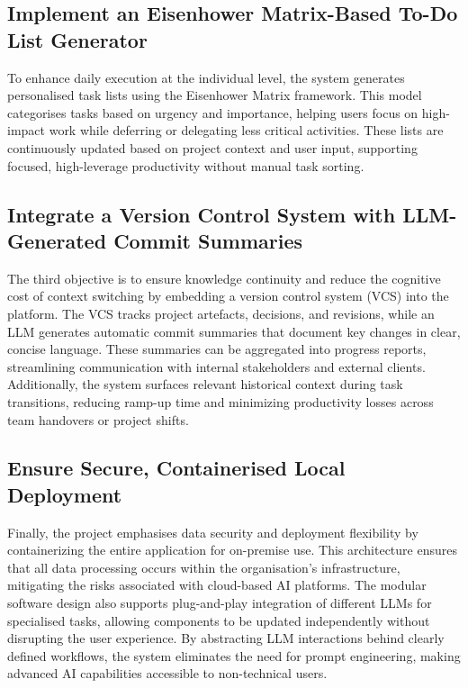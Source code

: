 \documentclass{report}
\begin{document}
\subsection{Implement an Eisenhower Matrix-Based To-Do List Generator}
To enhance daily execution at the individual level, the system generates personalised task lists using the Eisenhower Matrix framework. This model categorises tasks based on urgency and importance, helping users focus on high-impact work while deferring or delegating less critical activities. These lists are continuously updated based on project context and user input, supporting focused, high-leverage productivity without manual task sorting.
\subsection{Integrate a Version Control System with LLM-Generated Commit Summaries}
The third objective is to ensure knowledge continuity and reduce the cognitive cost of context switching by embedding a version control system (VCS) into the platform. The VCS tracks project artefacts, decisions, and revisions, while an LLM generates automatic commit summaries that document key changes in clear, concise language. These summaries can be aggregated into progress reports, streamlining communication with internal stakeholders and external clients. Additionally, the system surfaces relevant historical context during task transitions, reducing ramp-up time and minimizing productivity losses across team handovers or project shifts.
\subsection{Ensure Secure, Containerised Local Deployment}
Finally, the project emphasises data security and deployment flexibility by containerizing the entire application for on-premise use. This architecture ensures that all data processing occurs within the organisation’s infrastructure, mitigating the risks associated with cloud-based AI platforms. The modular software design also supports plug-and-play integration of different LLMs for specialised tasks, allowing components to be updated independently without disrupting the user experience. By abstracting LLM interactions behind clearly defined workflows, the system eliminates the need for prompt engineering, making advanced AI capabilities accessible to non-technical users.
\end{document}

